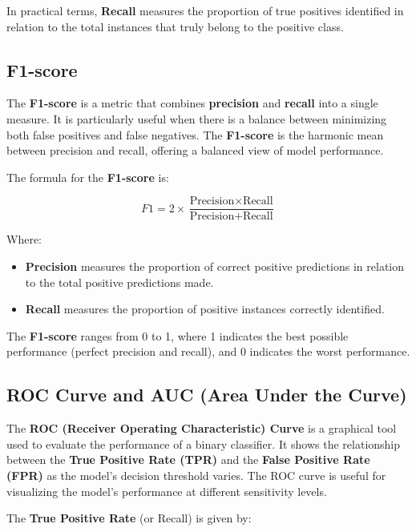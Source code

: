 \documentclass[conference]{IEEEtran}
\begin{document}
    In practical terms, \textbf{Recall} measures the proportion of true positives identified in relation to the total instances that truly belong to the positive class.
    
    \subsection{F1-score}
    
    The \textbf{F1-score} is a metric that combines \textbf{precision} and \textbf{recall} into a single measure. It is particularly useful when there is a balance between minimizing both false positives and false negatives. The \textbf{F1-score} is the harmonic mean between precision and recall, offering a balanced view of model performance.
    
    The formula for the \textbf{F1-score} is:
    
    \[
    F1 = 2 \times \frac{\text{Precision} \times \text{Recall}}{\text{Precision} + \text{Recall}}
    \]
    
    Where:
    
    \begin{itemize}
        \item \textbf{Precision} measures the proportion of correct positive predictions in relation to the total positive predictions made.
        \item \textbf{Recall} measures the proportion of positive instances correctly identified.
    \end{itemize}
    
    The \textbf{F1-score} ranges from 0 to 1, where 1 indicates the best possible performance (perfect precision and recall), and 0 indicates the worst performance.
    
    \subsection{ROC Curve and AUC (Area Under the Curve)}
    
    The \textbf{ROC (Receiver Operating Characteristic) Curve} is a graphical tool used to evaluate the performance of a binary classifier. It shows the relationship between the \textbf{True Positive Rate (TPR)} and the \textbf{False Positive Rate (FPR)} as the model's decision threshold varies. The ROC curve is useful for visualizing the model's performance at different sensitivity levels.
    
    The \textbf{True Positive Rate} (or Recall) is given by:
    
\end{document}
